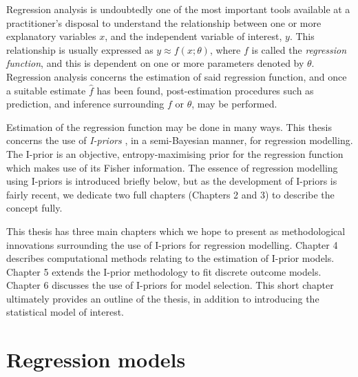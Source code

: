 \documentclass[a4paper,showframe,11pt]{report}
\begin{document}

Regression analysis is undoubtedly one of the most important tools available at a practitioner's disposal to understand the relationship between one or more explanatory variables $x$, and the independent variable of interest, $y$.
This relationship is usually expressed as $y \approx f(x;\theta)$, where $f$ is called the \emph{regression function}, and this is   dependent on one or more parameters denoted by $\theta$.
Regression analysis concerns the estimation of said regression function, and once a suitable estimate $\hat f$ has been found, post-estimation procedures such as prediction, and inference surrounding $f$ or $\theta$, may be performed.

Estimation of the regression function may be done in many ways.
This thesis concerns the use of \emph{I-priors} \citep{bergsma2017}, in a semi-Bayesian manner, for regression modelling.
The I-prior is an objective, entropy-maximising prior for the regression function which makes use of its Fisher information.
The essence of regression modelling using I-priors is introduced briefly below, but as the development of I-priors is fairly recent, we dedicate two full chapters (Chapters 2 and 3) to describe the concept fully.

This thesis has three main chapters which we hope to present as methodological innovations surrounding the use of I-priors for regression modelling.
Chapter 4 describes computational methods relating to the estimation of I-prior models.
Chapter 5 extends the I-prior methodology to fit discrete outcome models.
Chapter 6 discusses the use of I-priors for model selection. 
This short chapter ultimately provides an outline of the thesis, in addition to introducing the statistical model of interest.

\section{Regression models}
\label{sec:introregmod}
\end{document}
